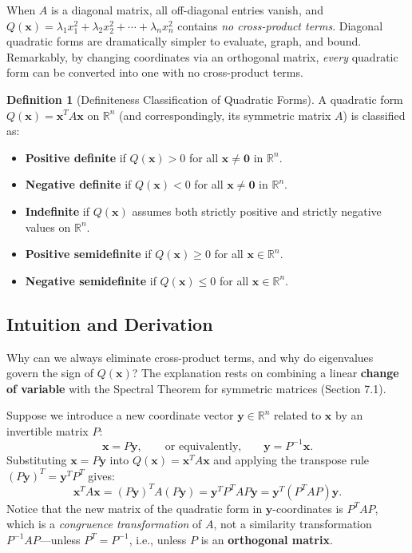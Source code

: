 \documentclass[11pt, letterpaper]{article}
\theoremstyle{definition}
\newtheorem{definition}{Definition}[section]
\theoremstyle{remark}
\begin{document}
When $A$ is a diagonal matrix, all off-diagonal entries vanish, and $Q(\mathbf{x}) = \lambda_1 x_1^2 + \lambda_2 x_2^2 + \cdots + \lambda_n x_n^2$ contains \emph{no cross-product terms}. Diagonal quadratic forms are dramatically simpler to evaluate, graph, and bound. Remarkably, by changing coordinates via an orthogonal matrix, \emph{every} quadratic form can be converted into one with no cross-product terms.

\begin{definition}[Definiteness Classification of Quadratic Forms]
A quadratic form $Q(\mathbf{x}) = \mathbf{x}^T A \mathbf{x}$ on $\mathbb{R}^n$ (and correspondingly, its symmetric matrix $A$) is classified as:
\begin{itemize}
    \item \textbf{Positive definite} if $Q(\mathbf{x}) > 0$ for all $\mathbf{x} \ne \mathbf{0}$ in $\mathbb{R}^n$.
    \item \textbf{Negative definite} if $Q(\mathbf{x}) < 0$ for all $\mathbf{x} \ne \mathbf{0}$ in $\mathbb{R}^n$.
    \item \textbf{Indefinite} if $Q(\mathbf{x})$ assumes both strictly positive and strictly negative values on $\mathbb{R}^n$.
    \item \textbf{Positive semidefinite} if $Q(\mathbf{x}) \ge 0$ for all $\mathbf{x} \in \mathbb{R}^n$.
    \item \textbf{Negative semidefinite} if $Q(\mathbf{x}) \le 0$ for all $\mathbf{x} \in \mathbb{R}^n$.
\end{itemize}
\end{definition}

\subsection{Intuition and Derivation}

Why can we always eliminate cross-product terms, and why do eigenvalues govern the sign of $Q(\mathbf{x})$? The explanation rests on combining a linear \textbf{change of variable} with the Spectral Theorem for symmetric matrices (Section 7.1).

Suppose we introduce a new coordinate vector $\mathbf{y} \in \mathbb{R}^n$ related to $\mathbf{x}$ by an invertible matrix $P$:
\[
\mathbf{x} = P\mathbf{y}, \qquad \text{or equivalently,} \qquad \mathbf{y} = P^{-1}\mathbf{x}.
\]
Substituting $\mathbf{x} = P\mathbf{y}$ into $Q(\mathbf{x}) = \mathbf{x}^T A \mathbf{x}$ and applying the transpose rule $(P\mathbf{y})^T = \mathbf{y}^T P^T$ gives:
\[
\mathbf{x}^T A \mathbf{x} = (P\mathbf{y})^T A (P\mathbf{y}) = \mathbf{y}^T P^T A P \mathbf{y} = \mathbf{y}^T (P^T A P) \mathbf{y}.
\]
Notice that the new matrix of the quadratic form in $\mathbf{y}$-coordinates is $P^T A P$, which is a \emph{congruence transformation} of $A$, not a similarity transformation $P^{-1} A P$—unless $P^T = P^{-1}$, i.e., unless $P$ is an \textbf{orthogonal matrix}.
\end{document}
